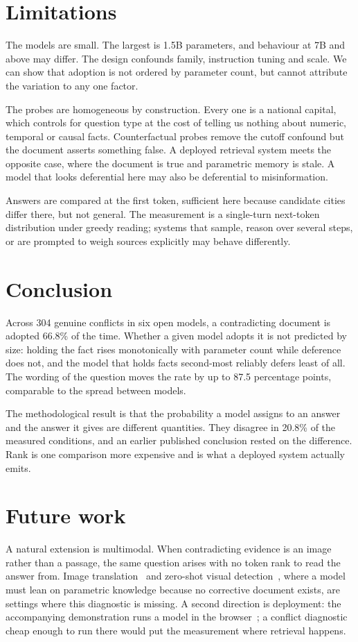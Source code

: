 \documentclass[10pt,conference]{IEEEtran}
\begin{document}
\section{Limitations}
The models are small. The largest is 1.5B parameters, and behaviour at 7B and above may differ. The design confounds family, instruction tuning and scale. We can show that adoption is not ordered by parameter count, but cannot attribute the variation to any one factor.

The probes are homogeneous by construction. Every one is a national capital, which controls for question type at the cost of telling us nothing about numeric, temporal or causal facts. Counterfactual probes remove the cutoff confound but the document asserts something false. A deployed retrieval system meets the opposite case, where the document is true and parametric memory is stale. A model that looks deferential here may also be deferential to misinformation.

Answers are compared at the first token, sufficient here because candidate cities differ there, but not general. The measurement is a single-turn next-token distribution under greedy reading; systems that sample, reason over several steps, or are prompted to weigh sources explicitly may behave differently.

\section{Conclusion}
Across 304 genuine conflicts in six open models, a contradicting document is adopted 66.8\% of the time. Whether a given model adopts it is not predicted by size: holding the fact rises monotonically with parameter count while deference does not, and the model that holds facts second-most reliably defers least of all. The wording of the question moves the rate by up to 87.5 percentage points, comparable to the spread between models.

The methodological result is that the probability a model assigns to an answer and the answer it gives are different quantities. They disagree in 20.8\% of the measured conditions, and an earlier published conclusion rested on the difference. Rank is one comparison more expensive and is what a deployed system actually emits.

\section*{Future work}
A natural extension is multimodal. When contradicting evidence is an image rather than a passage, the same question arises with no token rank to read the answer from. Image translation~\cite{thakur2021whitebox,thakur2021aoda} and zero-shot visual detection~\cite{thakur2026accident}, where a model must lean on parametric knowledge because no corrective document exists, are settings where this diagnostic is missing. A second direction is deployment: the accompanying demonstration runs a model in the browser~\cite{thakur2026demo}; a conflict diagnostic cheap enough to run there would put the measurement where retrieval happens.
\end{document}
